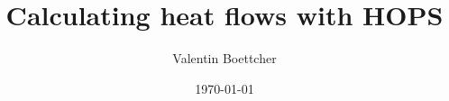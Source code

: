 \documentclass[fontsize=10pt,paper=b5,open=any,
,twoside=true,toc=listof,toc=bibliography,headings=optiontohead,
captions=nooneline,captions=tableabove,english,DIV=calc,numbers=noenddot,final,parskip=half,
headinclude=true,footinclude=false,BCOR=1cm]{scrbook}
\title{Calculating heat flows with HOPS}
\author{Valentin Boettcher}
\date{\today}
\begin{document}
\maketitle
\tableofcontents




\appendix


\printbibliography{}
\end{document}
